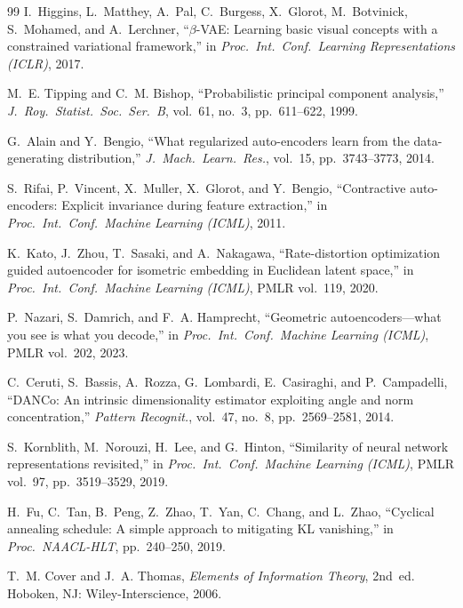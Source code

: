 \documentclass[11pt,a4paper]{jsarticle}
\begin{document}
\begin{thebibliography}{99}
I.~Higgins, L.~Matthey, A.~Pal, C.~Burgess, X.~Glorot, M.~Botvinick,
S.~Mohamed, and A.~Lerchner,
``$\beta$-VAE: Learning basic visual concepts with a constrained variational
framework,''
in \textit{Proc.\ Int.\ Conf.\ Learning Representations (ICLR)}, 2017.

M.~E. Tipping and C.~M. Bishop,
``Probabilistic principal component analysis,''
\textit{J.\ Roy.\ Statist.\ Soc.\ Ser.\ B}, vol.~61, no.~3, pp.~611--622,
1999.

G.~Alain and Y.~Bengio,
``What regularized auto-encoders learn from the data-generating
distribution,''
\textit{J.\ Mach.\ Learn.\ Res.}, vol.~15, pp.~3743--3773, 2014.

S.~Rifai, P.~Vincent, X.~Muller, X.~Glorot, and Y.~Bengio,
``Contractive auto-encoders: Explicit invariance during feature extraction,''
in \textit{Proc.\ Int.\ Conf.\ Machine Learning (ICML)}, 2011.

K.~Kato, J.~Zhou, T.~Sasaki, and A.~Nakagawa,
``Rate-distortion optimization guided autoencoder for isometric embedding in
Euclidean latent space,''
in \textit{Proc.\ Int.\ Conf.\ Machine Learning (ICML)}, PMLR vol.~119, 2020.

P.~Nazari, S.~Damrich, and F.~A. Hamprecht,
``Geometric autoencoders---what you see is what you decode,''
in \textit{Proc.\ Int.\ Conf.\ Machine Learning (ICML)}, PMLR vol.~202, 2023.

C.~Ceruti, S.~Bassis, A.~Rozza, G.~Lombardi, E.~Casiraghi, and
P.~Campadelli,
``DANCo: An intrinsic dimensionality estimator exploiting angle and norm
concentration,''
\textit{Pattern Recognit.}, vol.~47, no.~8, pp.~2569--2581, 2014.

S.~Kornblith, M.~Norouzi, H.~Lee, and G.~Hinton,
``Similarity of neural network representations revisited,''
in \textit{Proc.\ Int.\ Conf.\ Machine Learning (ICML)}, PMLR vol.~97,
pp.~3519--3529, 2019.

H.~Fu, C.~Tan, B.~Peng, Z.~Zhao, T.~Yan, C.~Chang, and L.~Zhao,
``Cyclical annealing schedule: A simple approach to mitigating KL
vanishing,''
in \textit{Proc.\ NAACL-HLT}, pp.~240--250, 2019.

T.~M. Cover and J.~A. Thomas,
\textit{Elements of Information Theory}, 2nd~ed.
Hoboken, NJ: Wiley-Interscience, 2006.


\end{thebibliography}
\end{document}
